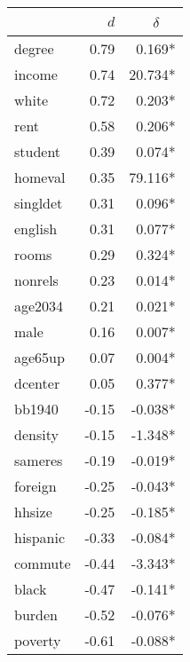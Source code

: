 \begin{tabular}{lrr}
	\toprule
	{}       &   $d$ & $\delta$~~ \\ \midrule
	degree   &  0.79 &     0.169* \\
	income   &  0.74 &    20.734* \\
	white    &  0.72 &     0.203* \\
	rent     &  0.58 &     0.206* \\
	student  &  0.39 &     0.074* \\
	homeval  &  0.35 &    79.116* \\
	singldet &  0.31 &     0.096* \\
	english  &  0.31 &     0.077* \\
	rooms    &  0.29 &     0.324* \\
	nonrels  &  0.23 &     0.014* \\
	age2034  &  0.21 &     0.021* \\
	male     &  0.16 &     0.007* \\
	age65up  &  0.07 &     0.004* \\
	dcenter  &  0.05 &     0.377* \\
	bb1940   & -0.15 &    -0.038* \\
	density  & -0.15 &    -1.348* \\
	sameres  & -0.19 &    -0.019* \\
	foreign  & -0.25 &    -0.043* \\
	hhsize   & -0.25 &    -0.185* \\
	hispanic & -0.33 &    -0.084* \\
	commute  & -0.44 &    -3.343* \\
	black    & -0.47 &    -0.141* \\
	burden   & -0.52 &    -0.076* \\
	poverty  & -0.61 &    -0.088* \\ \bottomrule
\end{tabular}

